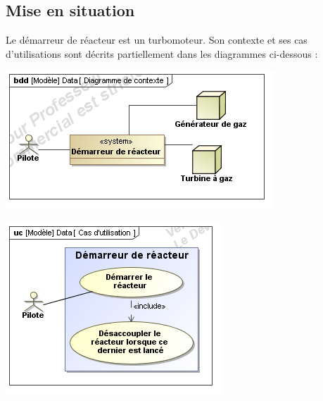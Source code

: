 \documentclass[10pt]{article}
\begin{document}

 \renewcommand{\baselinestretch}{1.2}
\setlength{\parskip}{0ex plus 0.5ex minus 0.2ex}


\subsection*{Mise en situation}
Le démarreur de réacteur est un turbomoteur. Son contexte et ses cas d'utilisations sont décrits partiellement dans les diagrammes ci-dessous :

\begin{minipage}[c]{.3\linewidth}
\begin{center}
\includegraphics[width=\textwidth]{images/contexte}
\end{center}
\end{minipage} \hfill
\begin{minipage}[c]{.3\linewidth}
\begin{center}
\includegraphics[width=\textwidth]{images/uc}
\end{center}
\end{minipage}\hfill
\end{document}
